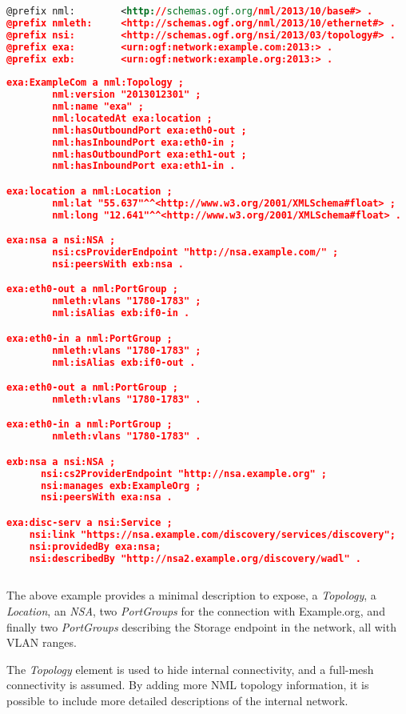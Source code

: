 \documentclass[12pt]{article}  %
\begin{document}
\begin{lstlisting}[language=XML]
@prefix nml:        <http://schemas.ogf.org/nml/2013/10/base#> .
@prefix nmleth:     <http://schemas.ogf.org/nml/2013/10/ethernet#> .
@prefix nsi:        <http://schemas.ogf.org/nsi/2013/03/topology#> .
@prefix exa:        <urn:ogf:network:example.com:2013:> .
@prefix exb:        <urn:ogf:network:example.org:2013:> .
  
exa:ExampleCom a nml:Topology ;
        nml:version "2013012301" ;
        nml:name "exa" ;
        nml:locatedAt exa:location ;
        nml:hasOutboundPort exa:eth0-out ;
        nml:hasInboundPort exa:eth0-in ;
        nml:hasOutboundPort exa:eth1-out ;
        nml:hasInboundPort exa:eth1-in .

exa:location a nml:Location ;
        nml:lat "55.637"^^<http://www.w3.org/2001/XMLSchema#float> ;
        nml:long "12.641"^^<http://www.w3.org/2001/XMLSchema#float> .

exa:nsa a nsi:NSA ;
        nsi:csProviderEndpoint "http://nsa.example.com/" ;
        nsi:peersWith exb:nsa .

exa:eth0-out a nml:PortGroup ;
        nmleth:vlans "1780-1783" ;
        nml:isAlias exb:if0-in .

exa:eth0-in a nml:PortGroup ;
        nmleth:vlans "1780-1783" ;
        nml:isAlias exb:if0-out .

exa:eth0-out a nml:PortGroup ;
        nmleth:vlans "1780-1783" .

exa:eth0-in a nml:PortGroup ;
        nmleth:vlans "1780-1783" .

exb:nsa a nsi:NSA ;
      nsi:cs2ProviderEndpoint "http://nsa.example.org" ;
      nsi:manages exb:ExampleOrg ;
      nsi:peersWith exa:nsa .

exa:disc-serv a nsi:Service ;
    nsi:link "https://nsa.example.com/discovery/services/discovery";
    nsi:providedBy exa:nsa;
    nsi:describedBy "http://nsa2.example.org/discovery/wadl" .
      
\end{lstlisting}



 The above example provides a minimal description to expose, 
a \emph{Topology}, a \emph{Location}, an \emph{NSA}, two \emph{PortGroups} for the connection with Example.org, 
and finally two \emph{PortGroups} describing the Storage endpoint in the network, all 
with VLAN ranges.

 The \emph{Topology} element is used to hide internal connectivity, and 
a full-mesh connectivity is assumed. By adding more NML topology information, it is possible 
to include more detailed descriptions of the internal network.
\end{document}
